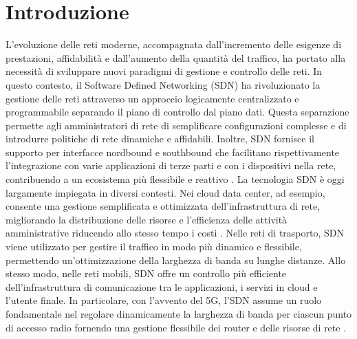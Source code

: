 \chapter{Introduzione}
L’evoluzione delle reti moderne, accompagnata dall’incremento delle esigenze di prestazioni, affidabilità e dall'aumento della quantità del traffico, ha portato alla necessità di sviluppare nuovi paradigmi di gestione e controllo delle reti. 
\newline In questo contesto, il Software Defined Networking (SDN) ha rivoluzionato la gestione delle reti attraverso un approccio logicamente centralizzato e programmabile separando il piano di controllo dal piano dati.
Questa separazione permette agli amministratori di rete di semplificare configurazioni complesse e di introdurre politiche di rete dinamiche e affidabili.
Inoltre, SDN fornisce il supporto per interfacce nordbound e southbound che facilitano rispettivamente l'integrazione con varie applicazioni di terze parti e con i dispositivi nella rete, contribuendo a un ecosistema più flessibile e reattivo \cite{sdnart}.
\newline La tecnologia SDN è oggi largamente impiegata in diversi contesti. 
Nei cloud data center, ad esempio, consente una gestione semplificata e ottimizzata dell’infrastruttura di rete, migliorando la distribuzione delle risorse e l'efficienza  delle attività amministrative riducendo allo stesso tempo i costi \cite{datacent}. 
Nelle reti di trasporto, SDN viene utilizzato per gestire il traffico in modo più dinamico e flessibile, permettendo un'ottimizzazione della larghezza di banda su lunghe distanze. Allo stesso modo, 
nelle reti mobili, SDN offre un controllo più efficiente dell'infrastruttura di comunicazione
tra le applicazioni, i servizi in cloud e l'utente finale. 
In particolare, con l'avvento del 5G, l'SDN assume un ruolo fondamentale nel regolare dinamicamente la larghezza di banda per ciascun punto di accesso radio fornendo una gestione flessibile dei router e delle risorse di rete\cite{5g} \cite{5gart}.
